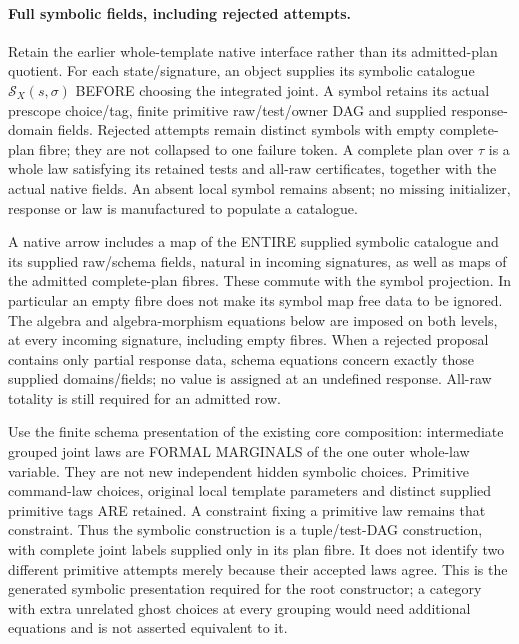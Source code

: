 \documentclass[11pt]{article}
\begin{document}
\paragraph{Full symbolic fields, including rejected attempts.}
Retain the earlier whole-template native interface rather than its admitted-plan quotient. For each state/signature, an object supplies its symbolic catalogue $\mathcal S_X(s,\sigma)$ BEFORE choosing the integrated joint. A symbol retains its actual prescope choice/tag, finite primitive raw/test/owner DAG and supplied response-domain fields. Rejected attempts remain distinct symbols with empty complete-plan fibre; they are not collapsed to one failure token. A complete plan over $\tau$ is a whole law satisfying its retained tests and all-raw certificates, together with the actual native fields. An absent local symbol remains absent; no missing initializer, response or law is manufactured to populate a catalogue.

A native arrow includes a map of the ENTIRE supplied symbolic catalogue and its supplied raw/schema fields, natural in incoming signatures, as well as maps of the admitted complete-plan fibres. These commute with the symbol projection. In particular an empty fibre does not make its symbol map free data to be ignored. The algebra and algebra-morphism equations below are imposed on both levels, at every incoming signature, including empty fibres. When a rejected proposal contains only partial response data, schema equations concern exactly those supplied domains/fields; no value is assigned at an undefined response. All-raw totality is still required for an admitted row.

Use the finite schema presentation of the existing core composition: intermediate grouped joint laws are FORMAL MARGINALS of the one outer whole-law variable. They are not new independent hidden symbolic choices. Primitive command-law choices, original local template parameters and distinct supplied primitive tags ARE retained. A constraint fixing a primitive law remains that constraint. Thus the symbolic construction is a tuple/test-DAG construction, with complete joint labels supplied only in its plan fibre. It does not identify two different primitive attempts merely because their accepted laws agree. This is the generated symbolic presentation required for the root constructor; a category with extra unrelated ghost choices at every grouping would need additional equations and is not asserted equivalent to it.
\end{document}
